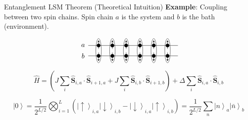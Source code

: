\documentclass[professionalfont]{beamer}
\theoremstyle{definition}
\newcommand{\lr}[1]{\left(#1\right)}
\newcommand{\ket}[1]{\left| #1 \right\rangle}
\newcommand{\bo}[1]{\mathbf{#1}}
\begin{document}
\begin{frame}{Entanglement LSM Theorem (Theoretical Intuition)}
\textbf{Example}: Coupling between two spin chains. Spin chain $a$ is the system and $b$ is the bath (environment).

\begin{equation*}
\begin{tikzpicture}[scale=0.5,baseline={([yshift=-7pt]current bounding box.center)}]
\filldraw[fill=black] (0pt,0pt) circle (5pt);
\draw[->,>=stealth] (0pt,-10pt) -- (0pt,15pt);
\filldraw[fill=black] (0pt,-30pt) circle (5pt);
\draw[->,>=stealth] (0pt,-20pt) -- (0pt,-45pt);
\draw (0pt,-15pt) ellipse (8pt and 35pt);

\filldraw[fill=black] (40pt,0pt) circle (5pt);
\draw[->,>=stealth] (40pt,-10pt) -- (40pt,15pt);
\filldraw[fill=black] (40pt,-30pt) circle (5pt);
\draw[->,>=stealth] (40pt,-20pt) -- (40pt,-45pt);
\draw (40pt,-15pt) ellipse (8pt and 35pt);

\filldraw[fill=black] (80pt,0pt) circle (5pt);
\draw[->,>=stealth] (80pt,-10pt) -- (80pt,15pt);
\filldraw[fill=black] (80pt,-30pt) circle (5pt);
\draw[->,>=stealth] (80pt,-20pt) -- (80pt,-45pt);
\draw (80pt,-15pt) ellipse (8pt and 35pt);

\filldraw[fill=black] (120pt,0pt) circle (5pt);
\draw[->,>=stealth] (120pt,-10pt) -- (120pt,15pt);
\filldraw[fill=black] (120pt,-30pt) circle (5pt);
\draw[->,>=stealth] (120pt,-20pt) -- (120pt,-45pt);
\draw (120pt,-15pt) ellipse (8pt and 35pt);

\filldraw[fill=black] (160pt,0pt) circle (5pt);
\draw[->,>=stealth] (160pt,-10pt) -- (160pt,15pt);
\filldraw[fill=black] (160pt,-30pt) circle (5pt);
\draw[->,>=stealth] (160pt,-20pt) -- (160pt,-45pt);
\draw (160pt,-15pt) ellipse (8pt and 35pt);

\filldraw[fill=black] (200pt,0pt) circle (5pt);
\draw[->,>=stealth] (200pt,-10pt) -- (200pt,15pt);
\filldraw[fill=black] (200pt,-30pt) circle (5pt);
\draw[->,>=stealth] (200pt,-20pt) -- (200pt,-45pt);
\draw (200pt,-15pt) ellipse (8pt and 35pt);

\draw (-30pt,0pt) -- (230pt,0pt);
\draw (-30pt,-30pt) -- (230pt,-30pt);
\node at (-45pt,0pt) {$a$};
\node at (-45pt,-30pt) {$b$};
\end{tikzpicture}
\end{equation*}

\[\hat{H} = \lr{J\sum_{i}\hat{\bo{S}}_{i,a}\cdot\hat{\bo{S}}_{i+1,a} + J\sum_{i}\hat{\bo{S}}_{i,b}\cdot\hat{\bo{S}}_{i+1,b}} + \Delta\sum_{i}\hat{\bo{S}}_{i,a}\cdot\hat{\bo{S}}_{i,b}\]

\[\ket{0}=\frac{1}{2^{L/2}}\bigotimes_{i=1}^{L}\lr{\ket{\uparrow}_{i,a}\ket{\downarrow}_{i,b} - \ket{\downarrow}_{i,a}\ket{\uparrow}_{i,b}} = \frac{1}{2^{L/2}}\sum_{n}\ket{n}_a\ket{\bar{n}}_b\]
    
\end{frame}
\end{document}
